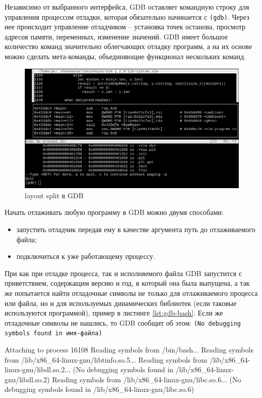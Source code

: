 Независимо от выбранного интерфейса, GDB оставляет командную строку для 
управления процессом отладки, которая обязательно начинается с \verb|(gdb)|.
Через нее происходит управление отладчиком -- установка точек останова,
просмотр адресов памяти, переменных, изменение значений.
GDB имеет большое количество команд значительно облегчающих отладку программ, 
а на их основе можно сделать мета-команды, объединяющие функционал нескольких
команд.

\begin{figure}[!hbtp]
    \includegraphics[width=\textwidth,height=\textheight,keepaspectratio]{images/split-layout.png}
    \caption{layout split в GDB\label{fig:layout-split}}
\end{figure}

Начать отлаживать любую программу в GDB можно двумя способами:
\begin{itemize}
    \item запустить отладчик передав ему в качестве аргумента путь до отлаживаемого файла;
    \item подключиться к уже работающему процессу.
\end{itemize}

При как при отладке процесса, так и исполняемого файла GDB
запустится с приветствием, содержащим версию и год, в который она была выпущена,
а так же попытается найти отладочные символы не только для отлаживаемого процесса или файла, 
но и для используемых динамических библиотек (если таковые используются программой),
пример в листинге \autoref{lst:gdb-bash}.
Если же отладочные символы не нашлись, то GDB сообщит об этом:
\verb|(No debugging symbols found in имя-файла)|

\begin{ListingEnv}[!h]
    \captiondelim{ }
    \caption{Отладка Bash}\label{lst:gdb-bash}
    \small
    \begin{Verb}[]
        Attaching to process 16108
        Reading symbols from /bin/bash...
        Reading symbols from /lib/x86_64-linux-gnu/libtinfo.so.5...
        Reading symbols from /lib/x86_64-linux-gnu/libdl.so.2...
        (No debugging symbols found in /lib/x86_64-linux-gnu/libdl.so.2)
        Reading symbols from /lib/x86_64-linux-gnu/libc.so.6...
        (No debugging symbols found in /lib/x86_64-linux-gnu/libc.so.6)
    \end{Verb}
\end{ListingEnv}
